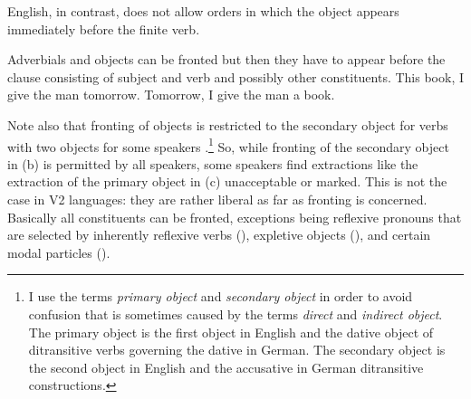 English, in contrast, does not allow orders in which the object appears immediately before the
finite verb.

\eal
{}
\zl 
Adverbials and objects can be fronted but then they have to appear before the clause consisting of
subject and verb and possibly other constituents.
\eal
\ex This book, I give the man tomorrow. 
\ex Tomorrow, I give the man a book.
\zl

Note also that fronting of objects is restricted to the secondary object for verbs with two objects
for some speakers \citep[]{Hudson92a-u}.\footnote{
  I use the terms \emph{primary object} and \emph{secondary object} in order to avoid confusion that is sometimes
  caused by the terms \emph{direct} and \emph{indirect object}. The primary object is the first object in English
  and the dative object of ditransitive verbs governing the dative in German. The secondary object
  is the second object in English and the accusative in German ditransitive constructions.
} So, while fronting of the secondary object in
(b) is permitted by all speakers, some speakers find extractions like the extraction of the
primary object in (c) unacceptable or marked.
\eal
\judgewidth{\%}
\zl
This is not the case in V2 languages: they are rather liberal as far as fronting
is concerned. Basically all constituents can be fronted, exceptions being reflexive
pronouns that are selected by inherently reflexive verbs (), expletive objects (), and certain modal
particles ().
\eal
{}
\zl
\eal
{}
\zl
\eal
{}
\zl

